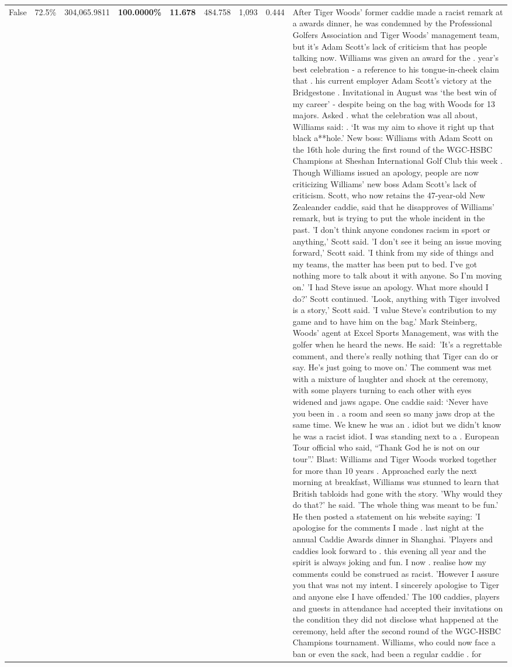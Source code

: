 \begin{table}[H]
\begin{tabular}{lllrlllll}
False & 72.5\% & 304,065.9811 & \bfseries \color{red} 100.0000\% & \bfseries \color{red} 11.678 & 484.758 & 1,093 & 0.444 & After Tiger Woods' former caddie made a racist remark at a awards dinner, he was condemned by the Professional Golfers Association and Tiger Woods' management team, but it's Adam Scott's lack of criticism that has people talking now. Williams was given an award for the . year’s best celebration - a reference to his tongue-in-cheek claim that . his current employer Adam Scott’s victory at the Bridgestone . Invitational in August was ‘the best win of my career’ - despite being on the bag with Woods for 13 majors. Asked . what the celebration was all about, Williams said: . ‘It was my aim to shove it right up that black a**hole.’ New boss: Williams with Adam Scott  on the 16th hole during the first round of the WGC-HSBC Champions at Sheshan International Golf Club this week . Though Williams issued an apology, people are now criticizing Williams' new boss Adam Scott's lack of criticism. Scott, who now retains the 47-year-old New Zealeander caddie, said that he disapproves of Williams' remark, but is trying to put the whole incident in the past. 'I don't think anyone condones racism in sport or anything,' Scott said. 'I don't see it being an issue moving forward,' Scott said. 'I think from my side of things and my teams, the matter has been put to bed. I've got nothing more to talk about it with anyone. So I'm moving on.' 'I had Steve issue an apology. What more should I do?' Scott continued. 'Look, anything with Tiger involved is a story,' Scott said. 'I value Steve's contribution to my game and to have him on the bag.' Mark Steinberg, Woods' agent at Excel Sports Management, was with the golfer when he heard the news. He said: 'It's a regrettable comment, and there's really nothing that Tiger can do or say. He's just going to move on.' The comment was met with a mixture of laughter and shock at the ceremony, with some players turning to each other with eyes widened and jaws agape. One caddie said: ‘Never have you been in . a room and seen so many jaws drop at the same time. We knew he was an . idiot but we didn’t know he was a racist idiot. I was standing next to a . European Tour official who said, “Thank God he is not on our tour”.’ Blast: Williams and Tiger Woods worked together for more than 10 years . Approached early the next morning at breakfast, Williams was stunned to learn that British tabloids had gone with the story. 'Why would they do that?' he said. 'The whole thing was meant to be fun.' He then posted a statement on his website saying: 'I apologise for the comments I made . last night at the annual Caddie Awards dinner in Shanghai. 'Players and caddies look forward to . this evening all year and the spirit is always joking and fun. I now . realise how my comments could be construed as racist. 'However I assure you that was not my intent. I sincerely apologise to Tiger and anyone else I have offended.' The 100 caddies, players and guests in attendance had accepted their invitations on the condition they did not disclose what happened at the ceremony, held after the second round of the WGC-HSBC Champions tournament. Williams, who could now face a ban or even the sack, had been a regular caddie . for 
\end{tabular}
\end{table}
